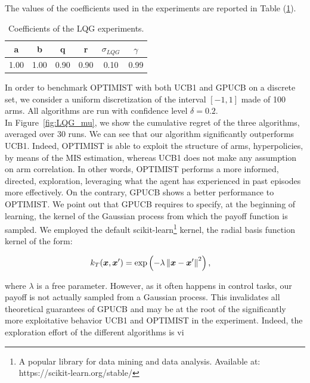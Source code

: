 The values of the coefficients used in the experiments are reported in Table (\ref{tab:LQGcoeff}).

\begin{table}[t!]
\centering
\begin{tabular}{*{6}{c}} 
\toprule
a & b & q & r & $\sigma_{LQG}$ & $\gamma$\\ 
\midrule
1.00 & 1.00 & 0.90 & 0.90 & 0.10 & 0.99 \\
\bottomrule
\end{tabular}
\caption{ Coefficients of the \gls{LQG} experiments.}
\label{tab:LQGcoeff}
\end{table}

In order to benchmark \gls{OPTIMIST} with both \gls{UCB}1 and \gls{GPUCB} on a discrete set, we consider a uniform discretization of the interval $[-1,1]$ made of 100 arms. All algorithms are run with confidence level $\delta=0.2$.\\
In Figure~\ref{fig:LQG_mu}, we show the cumulative regret of the three algorithms, averaged over 30 runs. We can see that our algorithm significantly outperforms \gls{UCB}1.
Indeed, \gls{OPTIMIST} is able to exploit the structure of arms, \ie hyperpolicies, by means of the \gls{MIS} estimation, whereas \gls{UCB}1 does not make any assumption on arm correlation. In other words, \gls{OPTIMIST} performs a more informed, \ie directed, exploration, leveraging what the agent has experienced in past episodes more effectively. On the contrary, \gls{GPUCB} shows a better performance \wrt to \gls{OPTIMIST}. We point out that \gls{GPUCB} requires to specify, at the beginning of learning, the kernel of the Gaussian process from which the payoff function is sampled. We employed the default scikit-learn\footnote{A popular library for data mining and data analysis. Available at: https://scikit-learn.org/stable/} kernel, \ie the radial basis function kernel of the form:

\begin{align}
	k_T(\boldsymbol{x},\boldsymbol{x}') &= \exp\left(-\lambda\left\|\boldsymbol{x}-\boldsymbol{x}'\right\|_{}^2\right),
\end{align}

where $\lambda$ is a free parameter. However, as it often happens in control tasks, our payoff is not actually sampled from a Gaussian process. This invalidates all theoretical guarantees of \gls{GPUCB} and may be at the root of the significantly more exploitative behavior \wrt \gls{UCB}1 and \gls{OPTIMIST} in the experiment. Indeed, the exploration effort of the different algorithms is vi

